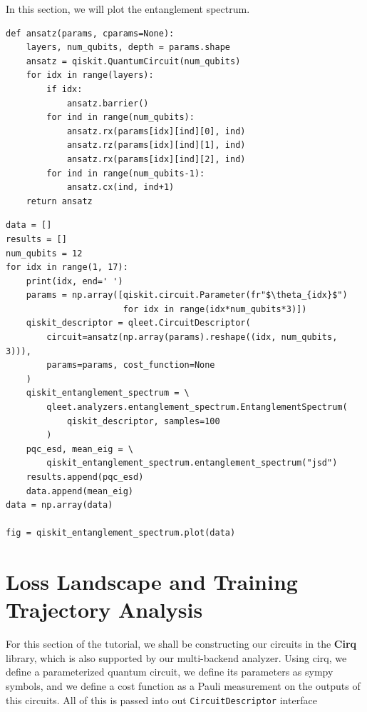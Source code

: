 In this section, we will plot the entanglement spectrum.

\begin{lstlisting}
def ansatz(params, cparams=None):
    layers, num_qubits, depth = params.shape
    ansatz = qiskit.QuantumCircuit(num_qubits)
    for idx in range(layers):
        if idx:
            ansatz.barrier()
        for ind in range(num_qubits):
            ansatz.rx(params[idx][ind][0], ind)
            ansatz.rz(params[idx][ind][1], ind)
            ansatz.rx(params[idx][ind][2], ind)
        for ind in range(num_qubits-1):
            ansatz.cx(ind, ind+1)
    return ansatz
\end{lstlisting}

\begin{lstlisting}
data = []
results = []
num_qubits = 12
for idx in range(1, 17):
    print(idx, end=' ')
    params = np.array([qiskit.circuit.Parameter(fr"$\theta_{idx}$")
                       for idx in range(idx*num_qubits*3)])
    qiskit_descriptor = qleet.CircuitDescriptor(
        circuit=ansatz(np.array(params).reshape((idx, num_qubits, 3))), 
        params=params, cost_function=None
    )
    qiskit_entanglement_spectrum = \
        qleet.analyzers.entanglement_spectrum.EntanglementSpectrum(
            qiskit_descriptor, samples=100
        )
    pqc_esd, mean_eig = \
        qiskit_entanglement_spectrum.entanglement_spectrum("jsd")
    results.append(pqc_esd)
    data.append(mean_eig)
data = np.array(data)

fig = qiskit_entanglement_spectrum.plot(data)
\end{lstlisting}

\section{\label{sec:supl-loss-tutorial}Loss Landscape and Training Trajectory Analysis}

For this section of the tutorial, we shall be constructing our circuits in the \textbf{Cirq} library, which is also supported by our multi-backend analyzer. Using cirq, we define a parameterized quantum circuit, we define its parameters as sympy symbols, and we define a cost function as a Pauli measurement on the outputs of this circuits. All of this is passed into out \lstinline{CircuitDescriptor} interface


